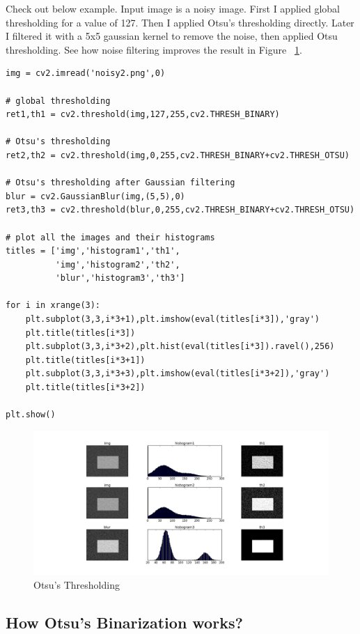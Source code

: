 \documentclass[a4paper,11pt]{book}
\begin{document}
Check out below example. Input image is a noisy image. First I applied global thresholding for a value of 127. Then I applied Otsu's thresholding directly. Later I filtered it with a 5x5 gaussian kernel to remove the noise, then applied Otsu thresholding. See how noise filtering improves the result in Figure ~\ref{fig:thresh_3}. 

\bigskip
\begin{lstlisting}
img = cv2.imread('noisy2.png',0)

# global thresholding
ret1,th1 = cv2.threshold(img,127,255,cv2.THRESH_BINARY)

# Otsu's thresholding
ret2,th2 = cv2.threshold(img,0,255,cv2.THRESH_BINARY+cv2.THRESH_OTSU)

# Otsu's thresholding after Gaussian filtering
blur = cv2.GaussianBlur(img,(5,5),0)
ret3,th3 = cv2.threshold(blur,0,255,cv2.THRESH_BINARY+cv2.THRESH_OTSU)

# plot all the images and their histograms
titles = ['img','histogram1','th1',
          'img','histogram2','th2',
          'blur','histogram3','th3']

for i in xrange(3):
    plt.subplot(3,3,i*3+1),plt.imshow(eval(titles[i*3]),'gray')
    plt.title(titles[i*3])
    plt.subplot(3,3,i*3+2),plt.hist(eval(titles[i*3]).ravel(),256)
    plt.title(titles[i*3+1])
    plt.subplot(3,3,i*3+3),plt.imshow(eval(titles[i*3+2]),'gray')
    plt.title(titles[i*3+2])

plt.show()
\end{lstlisting}
\bigskip

\begin{figure}[htp]
\centering
\includegraphics[scale=0.4]{img/thresh_3.png}
\caption{Otsu's Thresholding}
\label{fig:thresh_3}
\end{figure}

\subsection{How Otsu's Binarization works?}
\label{sub:Otsu_algorithm}
\end{document}
